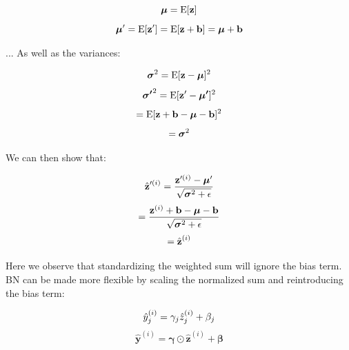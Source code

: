 \documentclass{article}
\begin{document}
\begin{multicols}{2}
\begin{equation}
    \boldsymbol{\mu} = \text{E}[\textbf{z}] \notag
\end{equation}
\begin{equation}
    \boldsymbol{\mu}' = \text{E}[\textbf{z}'] = \text{E}[\textbf{z} + \textbf{b}] = \boldsymbol{\mu} + \textbf{b} \notag
\end{equation}

... As well as the variances:

\begin{equation}
    \boldsymbol{\sigma}^2 = \text{E}[\textbf{z} - \boldsymbol{\mu}]^2\notag
\end{equation}
\begin{equation}
    \boldsymbol{\sigma'}^2 = \text{E}[\textbf{z}' - \boldsymbol{\mu'}]^2\notag
\end{equation}
\begin{equation}
     = \text{E}[\textbf{z} + \textbf{b} - \boldsymbol{\mu} - \textbf{b}]^2\notag
\end{equation}
\begin{equation}
    = \boldsymbol{\sigma}^2 \notag
\end{equation}


We can then show that:

\begin{equation}
    \hat{\textbf{z}}'^{(i)} = {\textbf{z}'^{(i)} - \boldsymbol{\mu}' \over \sqrt{\boldsymbol{\sigma}^2 + \epsilon}} \notag
\end{equation}
\begin{equation}
    = {\textbf{z}^{(i)} + \textbf{b} - \boldsymbol{\mu} - \textbf{b} \over \sqrt{\boldsymbol{\sigma}^2 + \epsilon}} \notag
\end{equation}
\begin{equation}
    = \hat{\textbf{z}}^{(i)} \notag
\end{equation}

Here we observe that standardizing the weighted sum will ignore the bias
term. BN can be made more flexible by scaling the normalized sum and 
reintroducing the bias term:

\begin{equation}
    \hat{y}_j^{(i)} = \gamma_j \hat{z}_j^{(i)} + \beta_j \notag
\end{equation}
\begin{equation}
    \hat{\textbf{y}}^{(i)} = \boldsymbol{\gamma} \odot \hat{\textbf{z}}^{(i)} + \boldsymbol{\beta} 
\end{equation}


\end{multicols}
\end{document}
